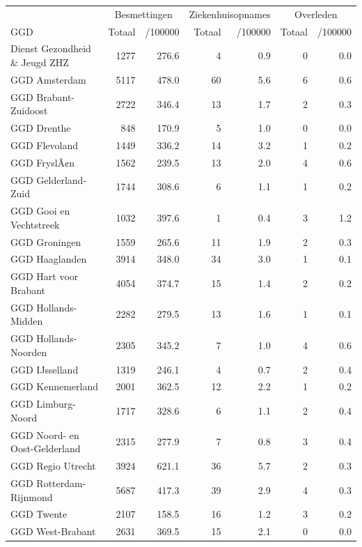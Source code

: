 \documentclass[
  english,
  man,floatsintext]{apa6}
\begin{document}
\begin{table}
\centering\begingroup\fontsize{10}{12}\selectfont

\begin{threeparttable}
\begin{tabular}{lrrrrrr}
\toprule
\multicolumn{1}{c}{ } & \multicolumn{2}{c}{Besmettingen} & \multicolumn{2}{c}{Ziekenhuisopnames} & \multicolumn{2}{c}{Overleden} \\
\cmidrule(l{3pt}r{3pt}){2-3} \cmidrule(l{3pt}r{3pt}){4-5} \cmidrule(l{3pt}r{3pt}){6-7}
GGD & Totaal & /100000 & Totaal & /100000 & Totaal & /100000\\
\midrule
Dienst Gezondheid \& Jeugd ZHZ & 1277 & 276.6 & 4 & 0.9 & 0 & 0.0\\
GGD Amsterdam & 5117 & 478.0 & 60 & 5.6 & 6 & 0.6\\
GGD Brabant-Zuidoost & 2722 & 346.4 & 13 & 1.7 & 2 & 0.3\\
GGD Drenthe & 848 & 170.9 & 5 & 1.0 & 0 & 0.0\\
GGD Flevoland & 1449 & 336.2 & 14 & 3.2 & 1 & 0.2\\
GGD FryslÃ¢n & 1562 & 239.5 & 13 & 2.0 & 4 & 0.6\\
GGD Gelderland-Zuid & 1744 & 308.6 & 6 & 1.1 & 1 & 0.2\\
GGD Gooi en Vechtstreek & 1032 & 397.6 & 1 & 0.4 & 3 & 1.2\\
GGD Groningen & 1559 & 265.6 & 11 & 1.9 & 2 & 0.3\\
GGD Haaglanden & 3914 & 348.0 & 34 & 3.0 & 1 & 0.1\\
GGD Hart voor Brabant & 4054 & 374.7 & 15 & 1.4 & 2 & 0.2\\
GGD Hollands-Midden & 2282 & 279.5 & 13 & 1.6 & 1 & 0.1\\
GGD Hollands-Noorden & 2305 & 345.2 & 7 & 1.0 & 4 & 0.6\\
GGD IJsselland & 1319 & 246.1 & 4 & 0.7 & 2 & 0.4\\
GGD Kennemerland & 2001 & 362.5 & 12 & 2.2 & 1 & 0.2\\
GGD Limburg-Noord & 1717 & 328.6 & 6 & 1.1 & 2 & 0.4\\
GGD Noord- en Oost-Gelderland & 2315 & 277.9 & 7 & 0.8 & 3 & 0.4\\
GGD Regio Utrecht & 3924 & 621.1 & 36 & 5.7 & 2 & 0.3\\
GGD Rotterdam-Rijnmond & 5687 & 417.3 & 39 & 2.9 & 4 & 0.3\\
GGD Twente & 2107 & 158.5 & 16 & 1.2 & 3 & 0.2\\
GGD West-Brabant & 2631 & 369.5 & 15 & 2.1 & 0 & 0.0\\

\end{tabular}
\end{threeparttable}
\end{table}
\end{document}
